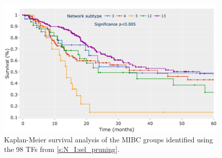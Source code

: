 \begin{figure}[!htb]
    \centering
    \includegraphics[width=1.0\textwidth,height=1.0\textheight,keepaspectratio]
{Sections/Network_I/Resources/selective_pruning/sel_tfs/survival_sel_tfs_cs.png}
    \caption[Example of Kaplam-Meier]{Kaplan-Meier survival analysis of the MIBC groups identified using the 98 TFs from \cref{s:N_I:sel_pruning}.}
    \label{fig:lit:surival_eg}
\end{figure}
